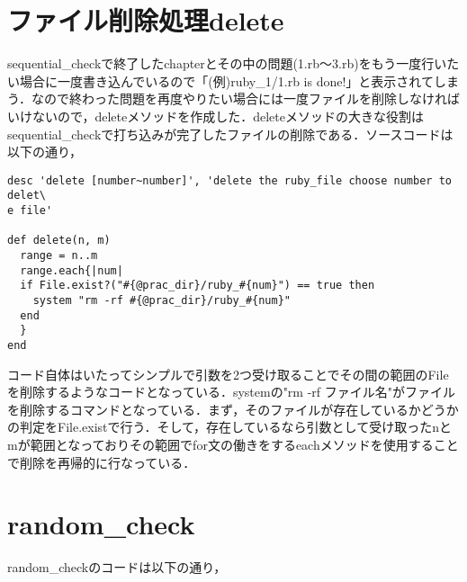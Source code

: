     \section{ファイル削除処理delete}\label{ux30d5ux30a1ux30a4ux30ebux524aux9664ux51e6ux7406delete}

sequential\_checkで終了したchapterとその中の問題(1.rb〜3.rb)をもう一度行いたい場合に一度書き込んでいるので「(例)ruby\_1/1.rb is done!」と表示されてしまう．なので終わった問題を再度やりたい場合には一度ファイルを削除しなければいけないので，deleteメソッドを作成した．deleteメソッドの大きな役割はsequential\_checkで打ち込みが完了したファイルの削除である．ソースコードは以下の通り，

\begin{screen}
{\small
\begin{verbatim}
desc 'delete [number~number]', 'delete the ruby_file choose number to delet\
e file'

def delete(n, m)
  range = n..m
  range.each{|num|
  if File.exist?("#{@prac_dir}/ruby_#{num}") == true then
    system "rm -rf #{@prac_dir}/ruby_#{num}"
  end
  }
end
\end{verbatim}}
\end{screen}

コード自体はいたってシンプルで引数を2つ受け取ることでその間の範囲のFileを削除するようなコードとなっている．systemの"rm -rf ファイル名"がファイルを削除するコマンドとなっている．まず，そのファイルが存在しているかどうかの判定をFile.existで行う．そして，存在しているなら引数として受け取ったnとmが範囲となっておりその範囲でfor文の働きをするeachメソッドを使用することで削除を再帰的に行なっている．

    \section{random\_check}\label{random_check}

random\_checkのコードは以下の通り，

